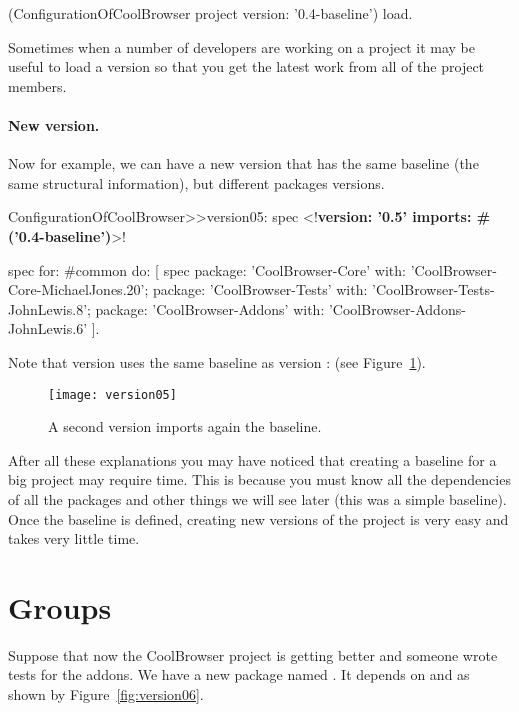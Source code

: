 \documentclass[a4paper,10pt,twoside]{book}
\begin{document}
\begin{code}{}
(ConfigurationOfCoolBrowser project version: '0.4-baseline') load.
\end{code}

Sometimes when a number of developers are working on a project it may be useful to load a  version so that you get the latest work from all of the project members.


\paragraph{New version.}
Now for example, we can have a new version  that has the same baseline (the same structural information), but different packages versions. 

\begin{code}{} 
ConfigurationOfCoolBrowser>>version05: spec 
       <!\textbf{version: '0.5' imports: \#('0.4-baseline')}>!
       
       spec for: #common do: [
              spec 
                     package: 'CoolBrowser-Core' with: 'CoolBrowser-Core-MichaelJones.20';
                     package: 'CoolBrowser-Tests' with: 'CoolBrowser-Tests-JohnLewis.8';
                     package: 'CoolBrowser-Addons' with: 'CoolBrowser-Addons-JohnLewis.6' ].
\end{code}

Note that version  uses the same baseline as version :  (see Figure~\ref{fig:version05}).

\begin{figure}
\begin{center}
\texttt{[image: version05]}
\caption{A second version imports again the baseline.}\label{fig:version05}
\end{center}
\end{figure} 

After all these explanations you may have noticed that creating a baseline for a big project may require time. This is because you must know all the dependencies of all the packages and other things we will see later (this was a simple baseline). Once the baseline is defined, creating new versions of the project is very easy and takes very little time. 

\section{Groups}
Suppose that now the CoolBrowser project is getting better and someone wrote tests for the addons. We have a new package named . It depends on  and  as shown by Figure~\ref{fig:version06}.
\end{document}
